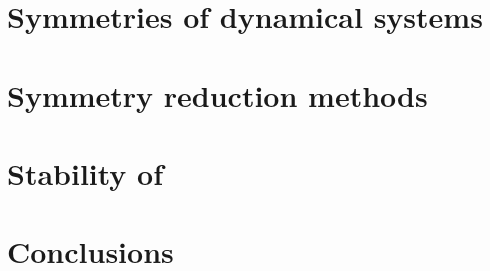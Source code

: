 \documentclass[aps,prl,preprint,superscriptaddress]{revtex4}
\begin{document}
\section{\label{s:symDyn} Symmetries of dynamical systems}
    

\section{\label{s:symRedGeneral} Symmetry reduction methods}
    
    
    
    
    
    


\section{Stability of \reqva}
    

\section{Conclusions}
    





    
\end{document}
